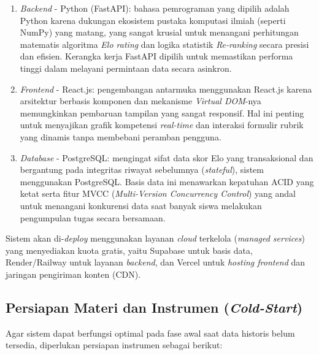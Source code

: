 \begin{enumerate}
    \item \textit{Backend} - Python (FastAPI):
    bahasa pemrograman yang dipilih adalah Python karena dukungan ekosistem pustaka komputasi ilmiah (seperti NumPy) yang matang, yang sangat krusial untuk menangani perhitungan matematis algoritma \textit{Elo rating} dan logika statistik \textit{Re-ranking} secara presisi dan efisien. Kerangka kerja FastAPI dipilih untuk memastikan performa tinggi dalam melayani permintaan data secara asinkron.
    
    \item \textit{Frontend} - React.js:
    pengembangan antarmuka menggunakan React.js karena arsitektur berbasis komponen dan mekanisme \textit{Virtual DOM}-nya memungkinkan pembaruan tampilan yang sangat responsif. Hal ini penting untuk menyajikan grafik kompetensi \textit{real-time} dan interaksi formulir rubrik yang dinamis tanpa membebani peramban pengguna.
    
    \item \textit{Database} - PostgreSQL:
    mengingat sifat data skor Elo yang transaksional dan bergantung pada integritas riwayat sebelumnya (\textit{stateful}), sistem menggunakan PostgreSQL. Basis data ini menawarkan kepatuhan ACID yang ketat serta fitur MVCC (\textit{Multi-Version Concurrency Control}) yang andal untuk menangani konkurensi data saat banyak siswa melakukan pengumpulan tugas secara bersamaan.
\end{enumerate}

Sistem akan di-\textit{deploy} menggunakan layanan \textit{cloud} terkelola (\textit{managed services}) yang menyediakan kuota gratis, yaitu Supabase untuk basis data, Render/Railway untuk layanan \textit{backend}, dan Vercel untuk \textit{hosting frontend} dan jaringan pengiriman konten (CDN).

\subsection{Persiapan Materi dan Instrumen (\textit{Cold-Start})}
Agar sistem dapat berfungsi optimal pada fase awal saat data historis belum tersedia, diperlukan persiapan instrumen sebagai berikut:

